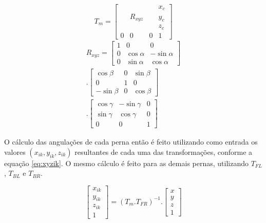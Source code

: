 \documentclass[../main.tex]{subfiles}
\begin{document}
  \begin{equation}
    \label{eq:Tm}
    T_m = 
    \begin{bmatrix}
    & & & x_c \\
    & R_{xyz} & & y_c \\
    & & & z_c \\
    0 & 0 & 0 & 1 
    \end{bmatrix}
  \end{equation}
  \begin{equation}
    \label{eq:Rxyz}
    \begin{split}
    R_{xyz} = 
    \begin{bmatrix}
    1 & 0 & 0\\
    0 & \cos\alpha & -\sin\alpha \\
    0 & \sin\alpha & \cos\alpha
    \end{bmatrix}
    \\.
    \begin{bmatrix}
    \cos\beta & 0 & \sin\beta \\
    0 & 1 & 0 \\
    -\sin\beta & 0 & \cos\beta
    \end{bmatrix}
    \\.
    \begin{bmatrix}
    \cos\gamma & -\sin\gamma & 0 \\
    \sin\gamma & \cos\gamma & 0 \\
    0 & 0 & 1
    \end{bmatrix}
    \end{split}
  \end{equation}

  O cálculo das angulações de cada perna então é feito utilizando como entrada os valores $(x_{ik}, y_{ik}, z_{ik})$ resultantes de cada uma das transformações, conforme a equação \ref{eq:xyzik}. O mesmo cálculo é feito para as demais pernas, utilizando  $T_{FL}$, $T_{BL}$ e $T_{BR}$.

  \begin{equation}
    \label{eq:xyzik}
    \begin{bmatrix}
    x_{ik} \\
    y_{ik} \\
    z_{ik} \\
    1
    \end{bmatrix}= (T_m.T_{FR})^{-1}. 
    \begin{bmatrix}
    x \\
    y \\
    z \\
    1
    \end{bmatrix}
  \end{equation}
\end{document}
